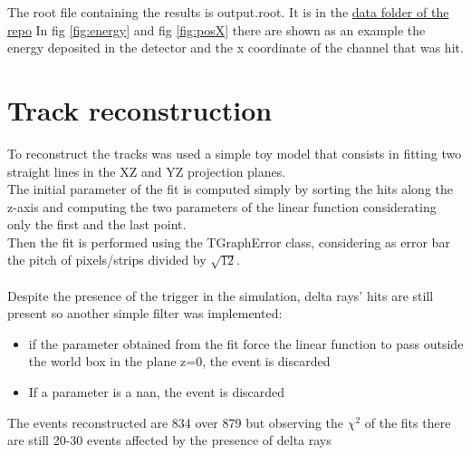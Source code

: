 \documentclass[10pt, a4paper, twocolumn]{article} %
\begin{document}
The root file containing the results is output.root. It is in the \href{https://github.com/pviscone/TrackG4/tree/main/data}{data folder of the repo}
In fig \ref{fig:energy} and fig \ref{fig:posX} there are shown as an example the energy deposited in the detector and the x coordinate of the channel that was hit.


\section{Track reconstruction}
To reconstruct the tracks was used a simple toy model that consists in fitting two straight lines in the XZ and YZ projection planes.
\\
The initial parameter of the fit is computed simply by sorting the hits along the z-axis and computing the two parameters of the linear function considerating only the first and the last point.\\
Then the fit is performed using the TGraphError class, considering as error bar the pitch of pixels/strips divided by $\sqrt{12}$.
\\
\\
Despite the presence of the trigger in the simulation, delta rays' hits are still present so another simple filter was implemented: 
\begin{itemize}
    \item if the parameter obtained from the fit force the linear function to pass outside the world box in the plane z=0, the event is discarded
    \item If a parameter is a nan, the event is discarded

\end{itemize}
The events reconstructed are 834 over 879 but observing the $\chi^2$ of the fits there are still 20-30 events affected by the presence of delta rays
\end{document}
